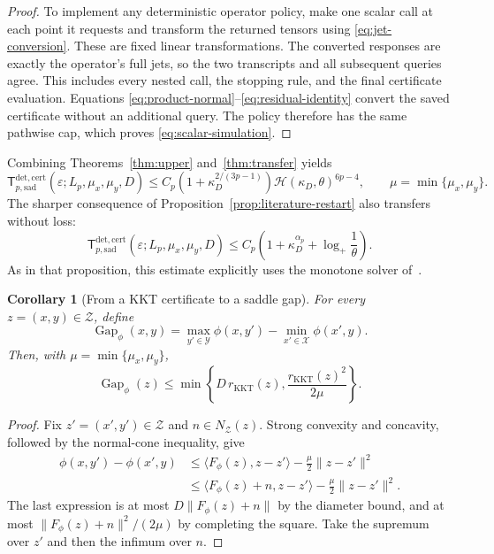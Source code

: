 \documentclass[11pt]{article}
\numberwithin{equation}{section}
\newtheorem{corollary}[theorem]{Corollary}
\theoremstyle{definition}
\theoremstyle{remark}
\newcommand{\ap}{\alpha_p}
\newcommand{\logplus}{\log_{+}}
\begin{document}
\begin{proof}
To implement any deterministic operator policy, make one scalar call
at each point it requests and transform the returned tensors using
\eqref{eq:jet-conversion}. These are fixed linear transformations. The converted
responses are exactly the operator's full jets, so the two transcripts
and all subsequent queries agree. This includes every nested call,
the stopping rule, and the final certificate evaluation. Equations
\eqref{eq:product-normal}--\eqref{eq:residual-identity} convert the saved certificate without
an additional query. The policy therefore has the same pathwise cap,
which proves \eqref{eq:scalar-simulation}.
\end{proof}

Combining Theorems~\ref{thm:upper} and~\ref{thm:transfer} yields
\begin{equation}\label{eq:saddle-hierarchy-upper}
\mathsf T_{p,\mathrm{sad}}^{\mathrm{det,cert}}
(\varepsilon;L_p,\mu_x,\mu_y,D)
\le C_p(1+\kappa_D^{2/(3p-1)})
\mathcal H(\kappa_D,\theta)^{6p-4},
\qquad \mu=\min\{\mu_x,\mu_y\}.
\end{equation}
The sharper consequence of Proposition~\ref{prop:literature-restart}
also transfers without loss:
\begin{equation}\label{eq:saddle-sharper}
\mathsf T_{p,\mathrm{sad}}^{\mathrm{det,cert}}
(\varepsilon;L_p,\mu_x,\mu_y,D)
\le C_p\left(1+\kappa_D^{\ap}+\logplus\frac1\theta\right).
\end{equation}
As in that proposition, this estimate explicitly uses the monotone
solver of~\cite{zhangchen2026}.

\begin{corollary}[From a KKT certificate to a saddle gap]
\label{cor:saddle-gap}
For every $z=(x,y)\in\mathcal Z$, define
\[
\operatorname{Gap}_\phi(x,y)
=\max_{y'\in\mathcal Y}\phi(x,y')
-\min_{x'\in\mathcal X}\phi(x',y).
\]
Then, with $\mu=\min\{\mu_x,\mu_y\}$,
\begin{equation}\label{eq:saddle-gap}
\operatorname{Gap}_\phi(z)
\le\min\!\left\{D\,r_{\mathrm{KKT}}(z),
\frac{r_{\mathrm{KKT}}(z)^2}{2\mu}\right\}.
\end{equation}
\end{corollary}

\begin{proof}
Fix $z'=(x',y')\in\mathcal Z$ and $n\in N_{\mathcal Z}(z)$.
Strong convexity and concavity, followed by the normal-cone inequality,
give
\begin{align*}
\phi(x,y')-\phi(x',y)
&\le\langle F_\phi(z),z-z'\rangle
 -\frac\mu2\|z-z'\|^2\\
&\le\langle F_\phi(z)+n,z-z'\rangle
 -\frac\mu2\|z-z'\|^2.
\end{align*}
The last expression is at most $D\|F_\phi(z)+n\|$ by the diameter
bound, and at most $\|F_\phi(z)+n\|^2/(2\mu)$ by completing the
square. Take the supremum over $z'$ and then the infimum over $n$.
\end{proof}
\end{document}
